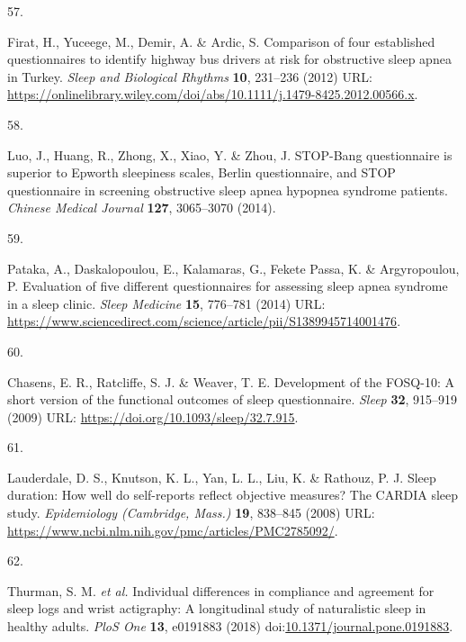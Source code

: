 \documentclass[
  10pt,
]{scrbook}
\newlength{\cslhangindent}
\newlength{\csllabelwidth}
\newlength{\cslentryspacingunit} %
\newenvironment{CSLReferences}[2] %
 {%
  \setlength{\parindent}{0pt}
  \ifodd #1
  \let\oldpar\par
  \def\par{\hangindent=\cslhangindent\oldpar}
  \fi
  \setlength{\parskip}{#2\cslentryspacingunit}
 }%
 {}
\newcommand{\CSLLeftMargin}[1]{\parbox[t]{\csllabelwidth}{#1}}
\newcommand{\CSLRightInline}[1]{\parbox[t]{\linewidth - \csllabelwidth}{#1}\break}
\begin{document}
\begin{CSLReferences}{0}{0}
\leavevmode{}%
\CSLLeftMargin{57. }%
\CSLRightInline{Firat, H., Yuceege, M., Demir, A. \& Ardic, S.
Comparison of four established questionnaires to identify highway bus
drivers at risk for obstructive sleep apnea in Turkey. \emph{Sleep and
Biological Rhythms} \textbf{10}, 231--236 (2012) URL:
\url{https://onlinelibrary.wiley.com/doi/abs/10.1111/j.1479-8425.2012.00566.x}.}

\leavevmode{}%
\CSLLeftMargin{58. }%
\CSLRightInline{Luo, J., Huang, R., Zhong, X., Xiao, Y. \& Zhou, J.
STOP-Bang questionnaire is superior to Epworth sleepiness scales, Berlin
questionnaire, and STOP questionnaire in screening obstructive sleep
apnea hypopnea syndrome patients. \emph{Chinese Medical Journal}
\textbf{127}, 3065--3070 (2014).}

\leavevmode{}%
\CSLLeftMargin{59. }%
\CSLRightInline{Pataka, A., Daskalopoulou, E., Kalamaras, G., Fekete
Passa, K. \& Argyropoulou, P. Evaluation of five different
questionnaires for assessing sleep apnea syndrome in a sleep clinic.
\emph{Sleep Medicine} \textbf{15}, 776--781 (2014) URL:
\url{https://www.sciencedirect.com/science/article/pii/S1389945714001476}.}

\leavevmode{}%
\CSLLeftMargin{60. }%
\CSLRightInline{Chasens, E. R., Ratcliffe, S. J. \& Weaver, T. E.
Development of the FOSQ-10: A short version of the functional outcomes
of sleep questionnaire. \emph{Sleep} \textbf{32}, 915--919 (2009) URL:
\url{https://doi.org/10.1093/sleep/32.7.915}.}

\leavevmode{}%
\CSLLeftMargin{61. }%
\CSLRightInline{Lauderdale, D. S., Knutson, K. L., Yan, L. L., Liu, K.
\& Rathouz, P. J. Sleep duration: How well do self-reports reflect
objective measures? The CARDIA sleep study. \emph{Epidemiology
(Cambridge, Mass.)} \textbf{19}, 838--845 (2008) URL:
\url{https://www.ncbi.nlm.nih.gov/pmc/articles/PMC2785092/}.}

\leavevmode{}%
\CSLLeftMargin{62. }%
\CSLRightInline{Thurman, S. M. \emph{et al.} Individual differences in
compliance and agreement for sleep logs and wrist actigraphy: A
longitudinal study of naturalistic sleep in healthy adults. \emph{PloS
One} \textbf{13}, e0191883 (2018)
doi:\href{https://doi.org/10.1371/journal.pone.0191883}{10.1371/journal.pone.0191883}.}


\end{CSLReferences}
\end{document}
